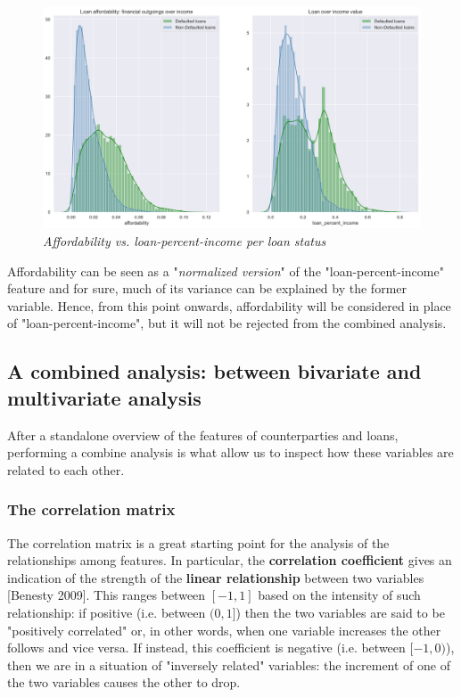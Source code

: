 \documentclass[a4paper,12pt]{article}
\begin{document}
        \begin{figure}[H]
            \centerline{
                \includegraphics[width=\linewidth]{./images/affordability.png}
            }
            \caption{\textit{Affordability vs. loan-percent-income per loan status}}
            \label{fig:affordability}
        \end{figure}

    Affordability can be seen as a "\textit{normalized version}" of the "loan-percent-income" 
    feature and for sure, much of its variance can be explained by the former variable. 
    Hence, from this point onwards, affordability will be considered in place of "loan-percent-income", 
    but it will not be rejected from the combined analysis.

    \subsection{A combined analysis: between bivariate and multivariate analysis}

    After a standalone overview of the features of counterparties and loans,
    performing a combine analysis is what allow us to inspect how 
    these variables are related to each other.

    \subsubsection{The correlation matrix}
    The correlation matrix is a great starting point for the analysis 
    of the relationships among features. In particular, 
    the \textbf{correlation coefficient} gives an indication of the 
    strength of the \textbf{linear relationship} between 
    two variables [Benesty 2009]. 
    This ranges between $[-1,1]$ based on the intensity of such 
    relationship: if positive (i.e. between $(0,1]$) then the two 
    variables are said to be "positively correlated" or, in other words,
    when one variable increases the other follows and vice versa. 
    If instead, this coefficient is negative (i.e. between $[-1,0)$), 
    then we are in a situation of "inversely related" variables: the 
    increment of one of the two variables causes the other to drop.
\end{document}
